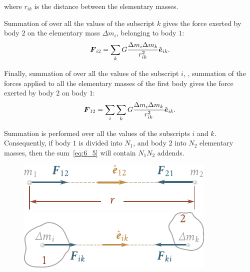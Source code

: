 \noindent
where $r_{ik}$ is the distance between the elementary masses.

Summation of  over all the values of the subscript $k$ gives the force exerted by body $2$ on the elementary mass $\Delta m_i$, belonging to body $1$:
\begin{equation}\label{eq:6_4}
	\boldsymbol{F}_{i2} = \sum_k G\frac{\Delta m_i\Delta m_k}{r_{ik}^2}\hat{\boldsymbol{e}}_{ik}.
\end{equation}

\noindent
Finally, summation of  over all the values of the subscript $i$, \ie, summation of the forces applied to all the elementary masses of the first body gives the force exerted by body $2$ on body $1$:
\begin{equation}\label{eq:6_5}
	\boldsymbol{F}_{12} = \sum_i \sum_k G\frac{\Delta m_i\Delta m_k}{r_{ik}^2}\hat{\boldsymbol{e}}_{ik}.
\end{equation}

\noindent
Summation is performed over all the values of the subscripts $i$ and $k$. Consequently, if body $1$ is divided into $N_1$, and body $2$ into $N_2$ elementary masses, then the sum~\eqref{eq:6_5} will contain $N_1N_2$ addends.

\begin{figure}[t]
	\begin{minipage}[t]{0.5\linewidth}
		\begin{center}
			\includegraphics[scale=0.95]{figures/ch_06/fig_6_1.pdf}
			\caption[]{}
			\label{fig:6_1}
		\end{center}
	\end{minipage}
	\hspace{-0.05cm}
	\begin{minipage}[t]{0.5\linewidth}
		\begin{center}
			\includegraphics[scale=1]{figures/ch_06/fig_6_2.pdf}
			\caption[]{}
			\label{fig:6_2}
		\end{center}
	\end{minipage}
	\vspace{-0.3cm}
\end{figure}

